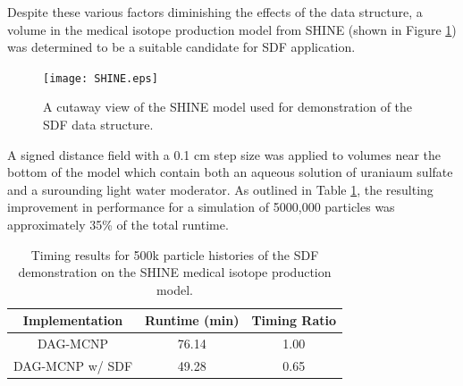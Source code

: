 \begin{table}[H]
  \small
\end{table}  


Despite these various factors diminishing the effects of the data structure, a
volume in the medical isotope production model from SHINE (shown in Figure
\ref{fig:shine_sdf}) was determined to be a suitable candidate for SDF
application.

\begin{figure}
\centering
\texttt{[image: SHINE.eps]}
\caption{A cutaway view of the SHINE model used for demonstration of the SDF
  data structure.}
\label{fig:shine_sdf}
\end{figure}

A signed distance field with a 0.1 cm step size was applied to volumes near the
bottom of the model which contain both an aqueous solution of uraniaum sulfate
and a surounding light water moderator. As outlined in Table
\ref{tab:shine_sdf_result}, the resulting improvement in performance for a
simulation of 5000,000 particles was approximately 35\% of the total runtime.

\begin{table}[H]
\centering
\begin{tabular}{c c c}
  \toprule
  \textbf{Implementation} & \textbf{Runtime (min)} & \textbf{Timing Ratio} \\
  \hline
  DAG-MCNP                & 76.14                  & 1.00                  \\
  DAG-MCNP w/ SDF         & 49.28                  & 0.65                  \\
  \bottomrule
\end{tabular}
\caption{Timing results for 500k particle histories of the SDF demonstration on
  the SHINE medical isotope production model.}
\label{tab:shine_sdf_result}
\end{table}

